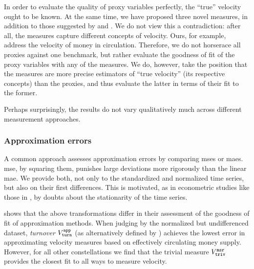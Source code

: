 In order to evaluate the quality of proxy variables perfectly, the ``true''
velocity ought to be known.  At the same time, we have proposed three novel
measures, in addition to those suggested by \cite{athey2016bitcoin} and
\cite{kalodner2017blocksci}.  We do not view this a contradiction: after all,
the measures capture different concepts of velocity.  Ours, for example,
address the velocity of money in circulation.  Therefore, we do not horserace
all proxies against one benchmark, but rather evaluate the goodness of fit of
the proxy variables with any of the measures.  We do, however, take the
position that the measures are more precise estimators of ``true velocity''
(its respective concepts) than the proxies, and thus evaluate the latter
in terms of their fit to the former.

Perhaps surprisingly, the results do not vary qualitatively much across
different measurement approaches. %

\subsubsection{Approximation errors}
\label{sec:results:sub:comp:subsub:errors}%
A common approach assesses approximation errors by comparing \aclp{mse} or
\aclp{mae}.  %
\ac{mse}, by squaring them, punishes large deviations more rigorously than
the linear \ac{mae}.  We provide both, not only to the standardized and
normalized time series, but also on their first differences.  %
This is motivated, as in econometric studies like those in , by
doubts about the stationarity of the time series.  %

 shows that the above transformations differ in their
assessment of the goodness of fit of approximation methods.  %
When judging by the normalized but undifferenced dataset, \emph{turnover}
${V^{{\mathtt{app}}}_{\mathtt{turn}}}$ (as alternatively defined by \cite{smith2017bitcoin}) achieves the
lowest error in approximating velocity measures based on effectively
circulating money supply.  %
However, for all other constellations we find that the trivial measure
${V_{\mathtt{triv}}^{\mathtt{msr}}}$ provides the closest fit to all ways to measure velocity.  %



